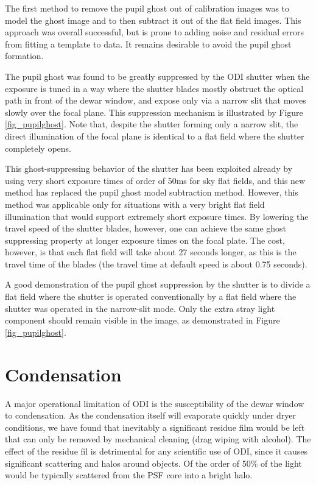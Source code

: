 \documentclass[]{spieman}
\begin{document}
The first method to remove the pupil ghost out of calibration images was to
model the ghost image and to then subtract it out of the flat field images. This
approach was overall successful, but is prone to adding noise and residual
errors from fitting a template to data. It remains desirable to avoid the pupil
ghost formation.

The pupil ghost was found to be greatly suppressed by the ODI shutter when the
exposure is tuned in a way where the shutter blades mostly obstruct the optical
path in front of the dewar window, and expose only via a narrow slit that moves
slowly over the focal plane. This suppression mechanism is illustrated by Figure
\ref{fig_pupilghost}. Note that, despite the shutter forming only a narrow slit,
the direct illumination of the focal plane is identical to a flat field where
the shutter completely opens.

This ghost-suppressing behavior of the shutter has been exploited already by
using very short exposure times of order of 50ms for sky flat fields, and this
new method has replaced the pupil ghost model subtraction method. However,
 this method was applicable only for situations with a very
bright flat field illumination that would support extremely short exposure
times. By lowering the travel speed of the shutter blades, however, one can
achieve the same ghost suppressing property at longer exposure times on the
focal plate. The cost, however, is that each flat field will take about 27
seconds longer, as this is the travel time of the blades (the travel time at
default speed is about 0.75 seconds).

A good demonstration of the pupil ghost suppression by the shutter is to divide
a flat field where the shutter is operated conventionally by a flat field where
the shutter was operated in the narrow-slit mode. Only the extra stray light
component should remain visible in the image, as demonstrated in Figure
\ref{fig_pupilghost}.


\section{Condensation}

A major operational limitation of ODI is the susceptibility of the dewar window
to condensation. As the condensation itself will evaporate quickly under dryer
conditions, we have found that inevitably a significant residue film would be
left that can only be removed by mechanical cleaning (drag wiping with alcohol).
The effect of the residue fil is detrimental for any scientific use of ODI,
since it causes significant scattering and halos around objects. Of the order of
50\%  of the light would be typically scattered from the PSF core into a bright
halo.
\end{document}
